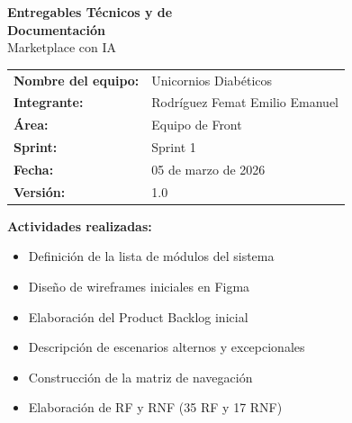 \documentclass[12pt,a4paper]{article}
\begin{document}
\begin{titlepage}
\centering
\vspace*{2cm}

{\Huge\bfseries\color{darkbg} Entregables Técnicos y de\\[6pt] Documentación}\\[1.5cm]
{\LARGE\color{darkprimary} Marketplace con IA}\\[2cm]

\begin{tabular}{ll}
\textbf{Nombre del equipo:} & Unicornios Diabéticos \\[8pt]
\textbf{Integrante:} & Rodríguez Femat Emilio Emanuel \\[8pt]
\textbf{Área:} & Equipo de Front \\[8pt]
\textbf{Sprint:} & Sprint 1 \\[8pt]
\textbf{Fecha:} & 05 de marzo de 2026 \\[8pt]
\textbf{Versión:} & 1.0 \\
\end{tabular}

\vspace{2cm}

{\large\bfseries Actividades realizadas:}\\[0.7cm]
\begin{minipage}{0.8\textwidth}
\begin{itemize}[leftmargin=*]
    \item Definición de la lista de módulos del sistema
    \item Diseño de wireframes iniciales en Figma
    \item Elaboración del Product Backlog inicial
    \item Descripción de escenarios alternos y excepcionales
    \item Construcción de la matriz de navegación
    \item Elaboración de RF y RNF (35 RF y 17 RNF)
\end{itemize}
\end{minipage}

\vfill
\end{titlepage}

\tableofcontents
\newpage
\end{document}
